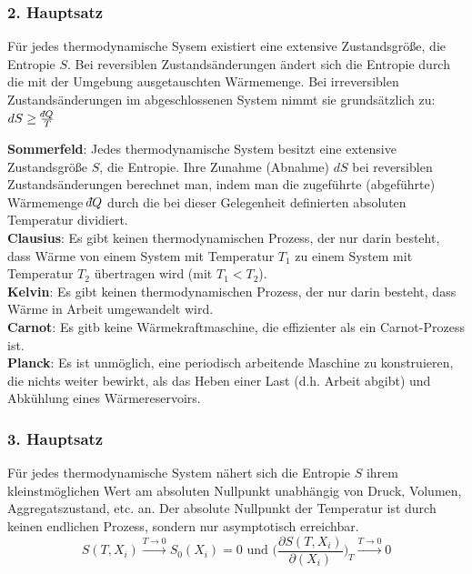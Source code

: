 \documentclass[12pt,a4paper]{article}
\renewcommand{\=}[1]{\stackrel{#1}{=}}
\def\dbar{{\mathchar'26\mkern-12mu d}}
\def\dbar{{\mathchar'26\mkern-12mu d}}
\theoremstyle{definition}
\theoremstyle{remark}
\begin{document}
\newpage
\subsubsection{2. Hauptsatz}
\begin{framed} \noindent Für jedes thermodynamische Sysem existiert eine extensive Zustandsgröße, die Entropie $S$. Bei reversiblen Zustandsänderungen ändert sich die Entropie durch die mit der Umgebung ausgetauschten Wärmemenge. Bei irreversiblen Zustandsänderungen im abgeschlossenen System nimmt sie grundsätzlich zu: $dS \geq \frac{\dbar Q}{T}$ \end{framed}

\begin{framed}
\noindent \textbf{Sommerfeld}: Jedes thermodynamische System besitzt eine extensive Zustandsgröße $S$, die Entropie. Ihre Zunahme (Abnahme) $dS$ bei reversiblen Zustandsänderungen berechnet man, indem man die zugeführte (abgeführte) Wärmemenge $\dbar Q$ durch die bei dieser Gelegenheit definierten absoluten Temperatur dividiert.\\
\noindent \textbf{Clausius}: Es gibt keinen thermodynamischen Prozess, der nur darin besteht, dass Wärme von einem System mit Temperatur $T_1$ zu einem System mit Temperatur $T_2$ übertragen wird (mit $T_1 < T_2$).\\
\noindent \textbf{Kelvin}: Es gibt keinen thermodynamischen Prozess, der nur darin besteht, dass Wärme in Arbeit umgewandelt wird.\\
\noindent \textbf{Carnot}: Es gitb keine Wärmekraftmaschine, die effizienter als ein Carnot-Prozess ist.\\
\noindent \textbf{Planck}: Es ist unmöglich, eine periodisch arbeitende Maschine zu konstruieren, die nichts weiter bewirkt, als das Heben einer Last (d.h. Arbeit abgibt) und Abkühlung eines Wärmereservoirs.
\end{framed}

\subsubsection{3. Hauptsatz}

\begin{framed} \noindent Für jedes thermodynamische System nähert sich die Entropie $S$ ihrem kleinstmöglichen Wert am absoluten Nullpunkt unabhängig von Druck, Volumen, Aggregatszustand, etc. an.
Der absolute Nullpunkt der Temperatur ist durch keinen endlichen Prozess, sondern nur asymptotisch erreichbar.
$$S(T,X_i) \xrightarrow{T \rightarrow 0} S_0(X_i) = 0 \text{ und } \Big(\frac{\partial S(T,X_i)}{\partial(X_i)}\Big)_T \xrightarrow{T \rightarrow 0} 0$$\end{framed}
\end{document}
